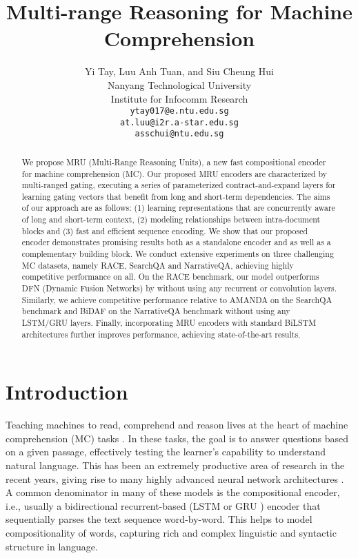 \documentclass{article}
\title{Multi-range Reasoning for Machine Comprehension}
\author{
  Yi Tay, Luu Anh Tuan, and Siu Cheung Hui\\
  Nanyang Technological University\\
  Institute for Infocomm Research \\
  \texttt{ytay017@e.ntu.edu.sg}\\
  \texttt{at.luu@i2r.a-star.edu.sg}\\
  \texttt{asschui@ntu.edu.sg} \\
}
\begin{document}
\maketitle

\begin{abstract}
 We propose \textsc{MRU} (Multi-Range Reasoning Units), a new fast compositional encoder for machine comprehension (MC).
Our proposed \textsc{MRU} encoders are characterized by multi-ranged gating, executing a series of parameterized contract-and-expand layers for learning gating vectors that benefit from long and short-term dependencies. The aims of our approach are as follows: (1) learning representations that are concurrently aware of long and short-term context, (2) modeling relationships between intra-document blocks and (3) fast and efficient sequence encoding. We show that our proposed encoder demonstrates promising results both as a standalone encoder and as well as a complementary building block. We conduct extensive experiments on three challenging MC datasets, namely RACE, SearchQA and NarrativeQA, achieving highly competitive performance on all. On the RACE benchmark, our model outperforms DFN (Dynamic Fusion Networks) by  without using any recurrent or convolution layers. Similarly, we achieve competitive performance relative to AMANDA \cite{kundu2018amanda} on the SearchQA benchmark and BiDAF \cite{seo2016bidirectional} on the NarrativeQA benchmark without using any LSTM/GRU layers. Finally, incorporating MRU encoders with standard BiLSTM architectures further improves performance, achieving state-of-the-art results. 
\end{abstract}


\section{Introduction}
Teaching machines to read, comprehend and reason lives at the heart of machine comprehension (MC) tasks \cite{rajpurkar2016squad,lai2017race,dunn2017searchqa,kovcisky2017narrativeqa}. In these tasks, the goal is to answer questions based
on a given passage, effectively testing the learner's capability to understand natural language. This has been an extremely productive area of research in the recent years, giving rise to many highly advanced neural network architectures \cite{DBLP:journals/corr/XiongZS16,seo2016bidirectional,hu2017mnemonic,shen2017reasonet,wang2016machine}. A common denominator in many of these models is the compositional encoder, i.e., usually a bidirectional recurrent-based (LSTM \cite{hochreiter1997long} or GRU \cite{cho2014learning}) encoder that sequentially parses the text sequence word-by-word. This helps to model compositionality of words, capturing rich and complex linguistic and syntactic structure in language. 
\end{document}
